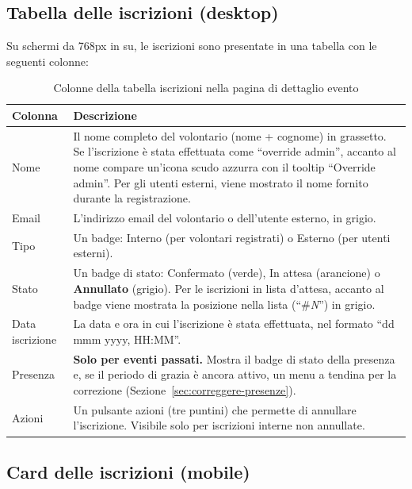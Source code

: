 \documentclass[a4paper,11pt,oneside]{book}
\begin{document}
\subsection{Tabella delle iscrizioni (desktop)}

Su schermi da 768px in su, le iscrizioni sono presentate in una tabella con le seguenti colonne:

\begin{table}[htbp]
\centering
\caption{Colonne della tabella iscrizioni nella pagina di dettaglio evento}
\label{tab:colonne-iscrizioni}
\begin{tabularx}{\textwidth}{l X}
\toprule
\textbf{Colonna} & \textbf{Descrizione} \\
\midrule
Nome          & Il nome completo del volontario (nome + cognome) in grassetto. Se l'iscrizione \`e stata effettuata come ``override admin'', accanto al nome compare un'icona scudo \textcolor{namoCyan}{azzurra} con il tooltip ``Override admin''. Per gli utenti esterni, viene mostrato il nome fornito durante la registrazione. \\
Email         & L'indirizzo email del volontario o dell'utente esterno, in grigio. \\
Tipo          & Un badge: \textcolor{namoCyan}{Interno} (per volontari registrati) o \textcolor{namoOrange}{Esterno} (per utenti esterni). \\
Stato         & Un badge di stato: \textcolor{namoGreen}{Confermato} (verde), \textcolor{namoOrange}{In attesa} (arancione) o \textbf{Annullato} (grigio). Per le iscrizioni in lista d'attesa, accanto al badge viene mostrata la posizione nella lista (``\#\textit{N}'') in grigio. \\
Data iscrizione & La data e ora in cui l'iscrizione \`e stata effettuata, nel formato ``dd mmm yyyy, HH:MM''. \\
Presenza      & \textbf{Solo per eventi passati.} Mostra il badge di stato della presenza e, se il periodo di grazia \`e ancora attivo, un menu a tendina per la correzione (Sezione~\ref{sec:correggere-presenze}). \\
Azioni        & Un pulsante azioni (tre puntini) che permette di annullare l'iscrizione. Visibile solo per iscrizioni interne non annullate. \\
\bottomrule
\end{tabularx}
\end{table}

\subsection{Card delle iscrizioni (mobile)}
\end{document}
